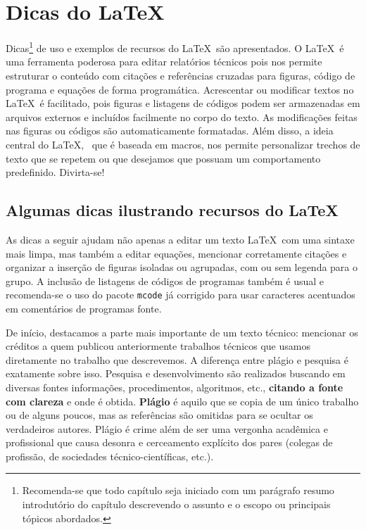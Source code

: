 \graphicspath{{figuras/}}

\chapter{Dicas do \LaTeX}
\label{cap2}

Dicas\footnote{Recomenda-se que todo capítulo seja iniciado com um parágrafo resumo introdutório do capítulo descrevendo o assunto e o escopo ou principais tópicos abordados.} de uso e exemplos de recursos do \LaTeX \, são apresentados. O \LaTeX\,   é uma ferramenta poderosa para editar relatórios técnicos pois nos permite estruturar o conteúdo com citações e referências cruzadas para figuras, código de programa e equações de forma programática. Acrescentar ou modificar textos no \LaTeX\, é facilitado, pois figuras e listagens de códigos podem ser armazenadas em arquivos externos e incluídos facilmente no corpo do texto. As modificações feitas nas figuras ou códigos são automaticamente formatadas. Além disso, a ideia central do \LaTeX, \, que é baseada em macros, nos permite personalizar trechos de texto que se repetem ou que desejamos que possuam um comportamento predefinido. Divirta-se!

\section{Algumas dicas ilustrando  recursos do \LaTeX}

As dicas a seguir ajudam não apenas a editar um texto \LaTeX\, com uma sintaxe mais limpa, mas também a editar equações, mencionar corretamente citações e organizar a inserção de figuras isoladas ou agrupadas, com ou sem legenda para o grupo.  A inclusão de listagens de códigos de programas também é usual e recomenda-se o uso do pacote \verb|mcode| já corrigido para usar caracteres acentuados em comentários de programas fonte.

De início, destacamos a parte mais importante de um texto técnico: mencionar os créditos a quem publicou anteriormente trabalhos técnicos que usamos diretamente no trabalho que descrevemos. A diferença entre plágio e pesquisa é exatamente sobre isso. Pesquisa e desenvolvimento são realizados  buscando em diversas fontes  informações, procedimentos, algoritmos, etc., \textbf{citando a fonte com clareza} e onde é  obtida. \textbf{Plágio} é aquilo que se copia de um único trabalho ou de alguns poucos, mas as referências são omitidas para se ocultar os verdadeiros autores. Plágio é crime além de ser uma vergonha acadêmica e profissional que causa desonra e cerceamento explícito dos pares (colegas de profissão, de sociedades técnico-científicas, etc.).

